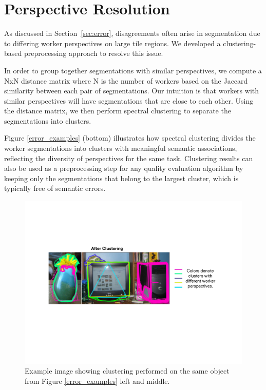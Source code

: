 \section{Perspective Resolution\label{perspective}}
\par As discussed in Section~\ref{sec:error}, disagreements often arise in segmentation due to differing worker perspectives on large tile regions. We developed a clustering-based preprocessing approach to resolve this issue.
\par In order to group together segmentations with similar perspectives, we compute a NxN distance matrix where N is the number of workers based on the Jaccard similarity between each pair of segmentations. Our intuition is that workers with similar perspectives will have segmentations that are close to each other. Using the distance matrix, we then perform spectral clustering to separate the segmentations into clusters. 
\par Figure \ref{error_examples} (bottom) illustrates how spectral clustering divides the worker segmentations into clusters with meaningful semantic associations, reflecting the diversity of perspectives for the same task. Clustering results can also be used as a preprocessing step for any quality evaluation algorithm by keeping only the segmentations that belong to the largest cluster, which is typically free of semantic errors.
    \begin{figure}[h!]
      \centering
      \includegraphics[width=\linewidth]{plots/clustering.pdf}
      \caption{Example image showing clustering performed on the same object from Figure \ref{error_examples} left and middle.}
      \label{cluster_example}
    \end{figure}
